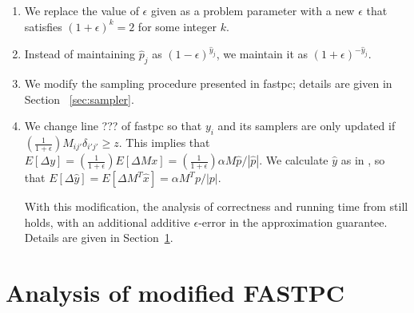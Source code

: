 \documentclass[11pt]{article}
\newcommand{\phat}{\hat{p}}
\newcommand{\xhat}{\hat{x}}
\newcommand{\yhat}{\hat{y}}
\newcommand{\sizeof}[1]{|#1|}
\newcommand{\incVal}{\delta_{i'j'}}
\newcommand{\epsDown}{\left( \frac{1}{1+\epsilon} \right) }
\newcommand{\epsUp}{(1+\epsilon)}
\begin{document}
\begin{enumerate}
\item We replace the value of $\epsilon$ given as a problem parameter with a new $\epsilon$ that 
 satisfies $(1+\epsilon)^k = 2$ for some integer $k$.  

\item Instead of maintaining $\phat_j$ as $(1-\epsilon)^{\yhat_j}$, we maintain it as $\epsUp^{-\yhat_j}$.  

\item We modify the sampling procedure presented in fastpc; details are given in Section~
\ref{sec:sampler}.

\item We change line ??? of fastpc so that $y_i$ and its 
samplers are only updated if $\epsDown M_{ij'}\incVal \geq z$.
This implies that $E[\Delta y] = \epsDown E[\Delta Mx] 
= \epsDown \alpha M \phat / \sizeof{\phat}$. We calculate
$\yhat$ as in \cite{kouf2007}, so that 
$E[\Delta \yhat] = E[\Delta M^T \xhat] = \alpha M^T p / \sizeof{p}$.  

With this modification, the analysis of correctness and running time from
\cite{kouf2007} still holds, with an additional additive $\epsilon$-error in 
the approximation guarantee.  Details are given in Section~\ref{sec:analysis}.

\end{enumerate}

%


\section{Analysis of modified FASTPC} \label{sec:analysis}

\end{document}
